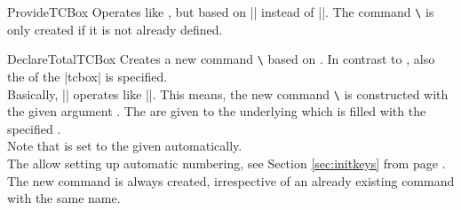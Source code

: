 \begin{docCommand}{ProvideTCBox}{}
  Operates like , but based on |\ProvideDocumentCommand| instead of |\DeclareDocumentCommand|.
  The command \texttt{\textbackslash} is only created if it is not already defined.
\end{docCommand}



\clearpage

\begin{docCommand}{DeclareTotalTCBox}{}
  Creates a new command \texttt{\textbackslash} based on .
  In contrast to , also the  of the |tcbox| is specified.\\
  Basically, |\DeclareTotalTCBox| operates like |\DeclareDocumentCommand|. This means,
  the new command \texttt{\textbackslash} is constructed with the given argument .
  The  are given to the underlying  which is filled with
  the specified .\\
  Note that  is set to the given 
  automatically.\\
  The  allow setting up automatic numbering,
  see Section \ref{sec:initkeys} from page \pageref{sec:initkeys}.\\
  The new command is always created, irrespective of an already existing
  command with the same name.



\end{docCommand}
